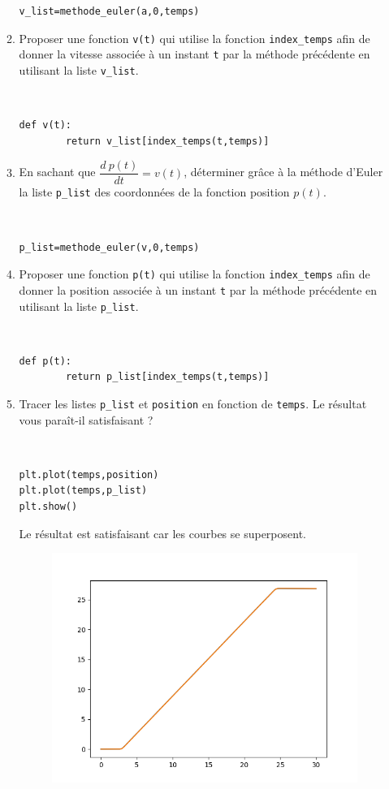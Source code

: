 \documentclass[a4paper,12pt]{article}
\begin{document}
\begin{enumerate}
\begin{enumerate}
\begin{solution}
\begin{verbatim}
v_list=methode_euler(a,0,temps)
\end{verbatim}
\end{solution}
\item Proposer une fonction \verb?v(t)? qui utilise la fonction \verb?index_temps? afin de donner la vitesse associée à un instant \verb?t? par la méthode précédente en utilisant la liste \verb?v_list?.
\begin{solution}~\ \\
\begin{verbatim}
def v(t):
        return v_list[index_temps(t,temps)]
\end{verbatim}
\end{solution}
\item En sachant que $\dfrac{d\ p(t)}{dt}=v(t)$, déterminer grâce à la méthode d'Euler la liste \verb?p_list? des coordonnées de la fonction position $p(t)$.
\begin{solution}~\ \\
\begin{verbatim}
p_list=methode_euler(v,0,temps)
\end{verbatim}
\end{solution}
\item Proposer une fonction \verb?p(t)? qui utilise la fonction \verb?index_temps? afin de donner la position associée à un instant \verb?t? par la méthode précédente en utilisant la liste \verb?p_list?.
\begin{solution}~\ \\
\begin{verbatim}
def p(t):
        return p_list[index_temps(t,temps)]
\end{verbatim}
\end{solution}
\item Tracer les listes \verb?p_list? et \verb?position? en fonction de \verb?temps?. Le résultat vous paraît-il satisfaisant ?
\begin{solution}~\ \\
\begin{verbatim}
plt.plot(temps,position)
plt.plot(temps,p_list)
plt.show()
\end{verbatim}
Le résultat est satisfaisant car les courbes se superposent.
\begin{figure}[!ht]
 \begin{center}
 \includegraphics[width=0.5\linewidth]{Code/figure3}

\end{center}
\end{figure}
\end{solution}
\end{enumerate}
\end{enumerate}
\end{document}
